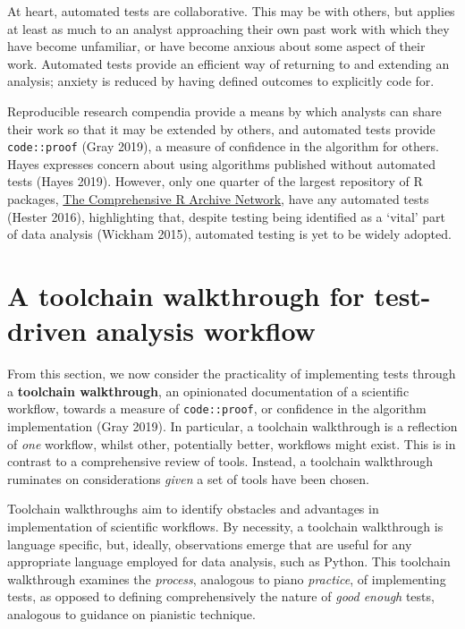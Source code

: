 \documentclass[
]{article}
\begin{document}
At heart, automated tests are collaborative. This may be with others,
but applies at least as much to an analyst approaching their own past
work with which they have become unfamiliar, or have become anxious
about some aspect of their work. Automated tests provide an efficient
way of returning to and extending an analysis; anxiety is reduced by
having defined outcomes to explicitly code for.

Reproducible research compendia provide a means by which analysts can
share their work so that it may be extended by others, and automated
tests provide \texttt{code::proof} (Gray 2019), a measure of confidence
in the algorithm for others. Hayes expresses concern about using
algorithms published without automated tests (Hayes 2019). However, only
one quarter of the largest repository of R packages,
\href{https://cran.r-project.org/}{The Comprehensive R Archive Network},
have any automated tests (Hester 2016), highlighting that, despite
testing being identified as a `vital' part of data analysis (Wickham
2015), automated testing is yet to be widely adopted.

\hypertarget{a-toolchain-walkthrough-for-test-driven-analysis-workflow}{%
\section{A toolchain walkthrough for test-driven analysis
workflow}\label{a-toolchain-walkthrough-for-test-driven-analysis-workflow}}

From this section, we now consider the practicality of implementing
tests through a \textbf{toolchain walkthrough}, an opinionated
documentation of a scientific workflow, towards a measure of
\texttt{code::proof}, or confidence in the algorithm implementation
(Gray 2019). In particular, a toolchain walkthrough is a reflection of
\emph{one} workflow, whilst other, potentially better, workflows might
exist. This is in contrast to a comprehensive review of tools. Instead,
a toolchain walkthrough ruminates on considerations \emph{given} a set
of tools have been chosen.

Toolchain walkthroughs aim to identify obstacles and advantages in
implementation of scientific workflows. By necessity, a toolchain
walkthrough is language specific, but, ideally, observations emerge that
are useful for any appropriate language employed for data analysis, such
as Python. This toolchain walkthrough examines the \emph{process},
analogous to piano \emph{practice}, of implementing tests, as opposed to
defining comprehensively the nature of \emph{good enough} tests,
analogous to guidance on pianistic technique.
\end{document}
